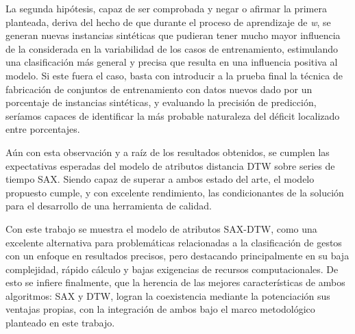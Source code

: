 \hfill\break
\justifying
La segunda hipótesis, capaz de ser comprobada y negar o afirmar la primera planteada, deriva del hecho de que durante el proceso de aprendizaje de \textit{w}, se generan nuevas instancias sintéticas que pudieran tener mucho mayor influencia de la considerada en la variabilidad de los casos de entrenamiento, estimulando una clasificación más general y precisa que resulta en una influencia positiva al modelo. Si este fuera el caso, basta con introducir a la prueba final la técnica de fabricación de conjuntos de entrenamiento con datos nuevos dado por un porcentaje de instancias sintéticas, y evaluando la precisión de predicción, seríamos capaces de identificar la más probable naturaleza del déficit localizado entre porcentajes.

\hfill\break
\justifying
Aún con esta observación y a raíz de los resultados obtenidos, se cumplen las expectativas esperadas del modelo de atributos distancia DTW sobre series de tiempo SAX. Siendo capaz de superar a ambos estado del arte, el modelo propuesto cumple, y con excelente rendimiento, las condicionantes de la solución para el desarrollo de una herramienta de calidad.

\hfill\break
\justifying
Con este trabajo se muestra el modelo de atributos SAX-DTW, como una excelente alternativa para problemáticas relacionadas a la clasificación de gestos con un enfoque en resultados precisos, pero destacando principalmente en su baja complejidad, rápido cálculo y bajas exigencias de recursos computacionales. De esto se infiere finalmente, que la herencia de las mejores características de ambos algoritmos: SAX y DTW, logran la coexistencia mediante la potenciación sus ventajas propias, con la integración de ambos bajo el marco metodológico planteado en este trabajo.